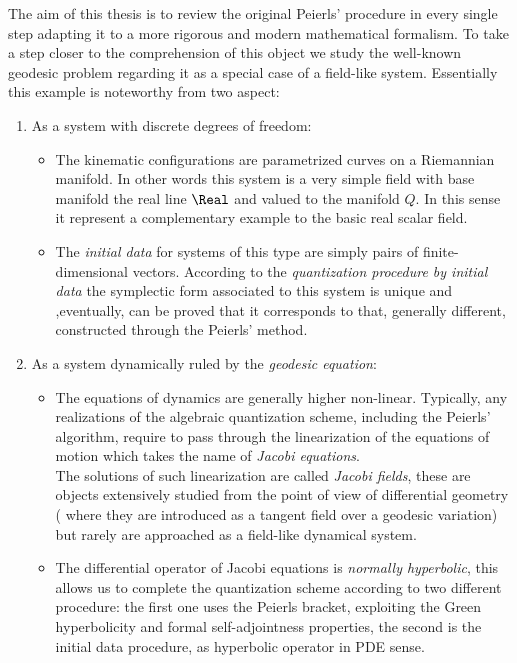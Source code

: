 \documentclass[Main]{subfiles}
\begin{document}
The aim of this thesis is to review the original Peierls' procedure in every single step adapting it to a more rigorous and modern mathematical formalism.
To take a step closer to the comprehension of this object we study the well-known geodesic problem regarding it as a special case of a field-like system.
Essentially this example is noteworthy from two aspect:
\begin{enumerate}
	\item As a system with discrete degrees of freedom:
	\begin{itemize}
		\item The kinematic configurations are parametrized curves on a Riemannian manifold.
\ifToninus
				In other words this system is a very simple field with base manifold the real line $\Real$ and valued to the manifold $Q$. 
				In this sense it represent a complementary example to the basic real scalar field.
\fi

		\item The \emph{initial data} for systems of this type are simply pairs of finite-dimensional vectors.
\ifToninus
			According to the \emph{quantization procedure by initial data} the symplectic form associated to this system is unique and ,eventually, can be proved that it corresponds to that, generally different, constructed through the Peierls' method.
\fi

	\end{itemize}

	\item As a system dynamically ruled by the \emph{geodesic equation}:
	\begin{itemize}
		\item The equations of dynamics are generally higher non-linear. 
		Typically, any realizations of the algebraic quantization scheme, including the Peierls' algorithm, require to pass through the linearization of the equations of motion which takes the name of \emph{Jacobi equations}.
			\\
			The solutions of such linearization are called \emph{Jacobi fields},
			these are objects extensively studied from the point of view of differential geometry 
			( where they are introduced as a tangent field over a geodesic variation) but rarely are approached as a field-like dynamical system.
		\item The differential operator of Jacobi equations is \emph{normally hyperbolic}, this allows us to complete the quantization scheme according to two different procedure: 
		the first one uses the Peierls bracket, exploiting the Green hyperbolicity and formal self-adjointness properties, 
		the second is the initial data procedure, as hyperbolic operator in PDE sense.
	\end{itemize}
\end{enumerate}
\end{document}
